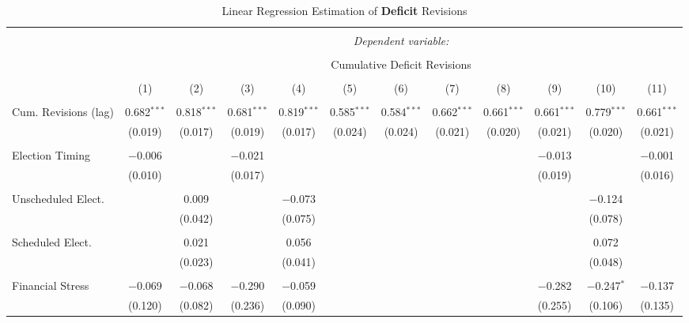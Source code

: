 
\begin{table}[!htbp] \centering 
  \caption{Linear Regression Estimation of \textbf{Deficit} Revisions} 
  \label{deficit_results} 
\tiny 
\begin{tabular}{@{\extracolsep{5pt}}lccccccccccc} 
\\[-1.8ex]\hline 
\hline \\[-1.8ex] 
 & \multicolumn{11}{c}{\textit{Dependent variable:}} \\ 
\cline{2-12} 
\\[-1.8ex] & \multicolumn{11}{c}{Cumulative Deficit Revisions} \\ 
\\[-1.8ex] & (1) & (2) & (3) & (4) & (5) & (6) & (7) & (8) & (9) & (10) & (11)\\ 
\hline \\[-1.8ex] 
 Cum. Revisions (lag) & 0.682$^{***}$ & 0.818$^{***}$ & 0.681$^{***}$ & 0.819$^{***}$ & 0.585$^{***}$ & 0.584$^{***}$ & 0.662$^{***}$ & 0.661$^{***}$ & 0.661$^{***}$ & 0.779$^{***}$ & 0.661$^{***}$ \\ 
  & (0.019) & (0.017) & (0.019) & (0.017) & (0.024) & (0.024) & (0.021) & (0.020) & (0.021) & (0.020) & (0.021) \\ 
  & & & & & & & & & & & \\ 
 Election Timing & $-$0.006 &  & $-$0.021 &  &  &  &  &  & $-$0.013 &  & $-$0.001 \\ 
  & (0.010) &  & (0.017) &  &  &  &  &  & (0.019) &  & (0.016) \\ 
  & & & & & & & & & & & \\ 
 Unscheduled Elect. &  & 0.009 &  & $-$0.073 &  &  &  &  &  & $-$0.124 &  \\ 
  &  & (0.042) &  & (0.075) &  &  &  &  &  & (0.078) &  \\ 
  & & & & & & & & & & & \\ 
 Scheduled Elect. &  & 0.021 &  & 0.056 &  &  &  &  &  & 0.072 &  \\ 
  &  & (0.023) &  & (0.041) &  &  &  &  &  & (0.048) &  \\ 
  & & & & & & & & & & & \\ 
 Financial Stress & $-$0.069 & $-$0.068 & $-$0.290 & $-$0.059 &  &  &  &  & $-$0.282 & $-$0.247$^{*}$ & $-$0.137 \\ 
  & (0.120) & (0.082) & (0.236) & (0.090) &  &  &  &  & (0.255) & (0.106) & (0.135) \\ 

\end{tabular}
\end{table}
